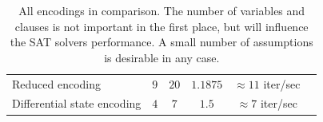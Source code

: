 \begin{table}
\begin{center}
\begin{tabular}{lccccc}
   Reduced encoding            & $9$          & $20$    & $1.1875$      & $\approx11$ iter/sec \\
   Differential state encoding & $4$          & $7$     & $1.5$         & $\approx7$ iter/sec \\
  \end{tabular}
  \caption[All encodings in comparison]{
    All encodings in comparison.
    The number of variables and clauses is not important in the first place, but will influence the SAT solvers performance.
    A small number of assumptions is desirable in any case.
  }
  \label{tab:encoding-cmp}
 \end{center}
\end{table}

